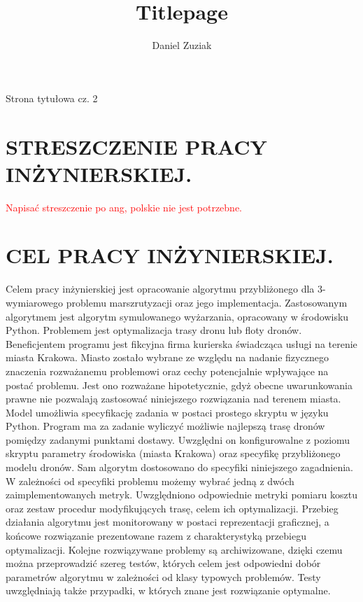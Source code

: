 \documentclass[twoside, 12pt]{article}
\title{Titlepage}
\author{Daniel Zuziak}
\begin{document}
\maketitle
\newpage



Strona tytułowa cz. 2
\newpage



\section{STRESZCZENIE PRACY INŻYNIERSKIEJ.}
\textcolor{red}{Napisać streszczenie po ang, polskie nie jest potrzebne.}
\newpage



\section{CEL PRACY INŻYNIERSKIEJ.}
\par Celem pracy inżynierskiej jest opracowanie algorytmu przybliżonego dla 3-wymiarowego problemu marszrutyzacji oraz jego implementacja. Zastosowanym algorytmem jest algorytm symulowanego wyżarzania, opracowany w środowisku Python. Problemem jest optymalizacja trasy dronu lub floty dronów. Beneficjentem programu jest fikcyjna firma kurierska świadcząca usługi na terenie miasta Krakowa. Miasto zostało wybrane ze względu na nadanie fizycznego znaczenia rozważanemu problemowi oraz cechy potencjalnie wpływające na postać problemu. Jest ono rozważane hipotetycznie, gdyż obecne uwarunkowania prawne nie pozwalają zastosować niniejszego rozwiązania nad terenem miasta. Model umożliwia specyfikację zadania w postaci prostego skryptu w języku Python. Program ma za zadanie wyliczyć możliwie najlepszą trasę dronów pomiędzy zadanymi punktami dostawy. Uwzględni on konfigurowalne z poziomu skryptu parametry środowiska (miasta Krakowa) oraz specyfikę przybliżonego modelu dronów. Sam algorytm dostosowano do specyfiki niniejszego zagadnienia. W zależności od specyfiki problemu możemy wybrać jedną z dwóch zaimplementowanych metryk. Uwzględniono odpowiednie metryki pomiaru kosztu oraz zestaw procedur modyfikujących trasę, celem ich optymalizacji. Przebieg działania algorytmu jest monitorowany w postaci reprezentacji graficznej, a końcowe rozwiązanie prezentowane razem z charakterystyką przebiegu optymalizacji. Kolejne rozwiązywane problemy są archiwizowane, dzięki czemu można przeprowadzić szereg testów, których celem jest odpowiedni dobór parametrów algorytmu w zależności od klasy typowych problemów. Testy uwzględniają także przypadki, w których znane jest rozwiązanie optymalne.
\newpage
\end{document}
